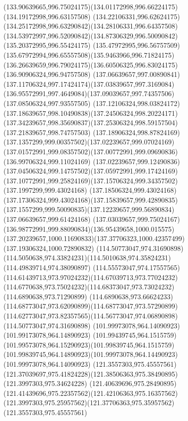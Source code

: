 {{		\curveto(133.90639665,996.75024175)(134.01172998,996.66224175)(134.19172998,996.63157508)
		\curveto(134.22106331,996.62624175)(134.25172998,996.63290842)(134.28106331,996.64357508)
		\curveto(134.53972997,996.52090842)(134.87306329,996.50090842)(135.20372995,996.55424175)
		\curveto(135.47972995,996.56757509)(135.67972994,996.65557508)(135.9463966,996.71824175)
		\curveto(136.26639659,996.79024175)(136.60506325,996.83024175)(136.90906324,996.94757508)
		\curveto(137.06639657,997.00890841)(137.11706324,997.17424174)(137.03839657,997.3169084)
		\curveto(136.95572991,997.4649084)(137.09039657,997.74357506)(137.08506324,997.93557505)
		\curveto(137.12106324,998.03824172)(137.18639657,998.10490838)(137.24506324,998.20224171)
		\curveto(137.34239657,998.35690837)(137.25306324,998.59157504)(137.21839657,998.74757503)
		\curveto(137.18906324,998.87824169)(137.1357299,999.00357502)(137.02239657,999.07024169)
		\curveto(137.01572991,999.08357502)(137.00772991,999.09690836)(136.99706324,999.11024169)
		\curveto(137.02239657,999.12490836)(137.04506324,999.14757502)(137.05972991,999.17424169)
		\curveto(137.10772991,999.25824169)(137.15706324,999.34357502)(137.1997299,999.43024168)
		\curveto(137.18506324,999.43024168)(137.17306324,999.43024168)(137.15839657,999.42890835)
		\curveto(137.1557299,999.50090835)(137.12239657,999.56890834)(137.06639657,999.61424168)
		\curveto(137.03039657,999.75024167)(136.98772991,999.88090834)(136.95439658,1000.015575)
		\curveto(137.20239657,1000.11690833)(137.37706323,1000.42357499)(137.19306324,1000.72890832)
		\moveto(114.50773047,974.31690898)
		\curveto(114.5050638,974.33824231)(114.5010638,974.35824231)(114.49839714,974.38090897)
		\curveto(114.55573047,974.17557565)(114.61439713,973.97024232)(114.67039713,973.77024232)
		\curveto(114.6770638,973.75024232)(114.68373047,973.73024232)(114.6890638,973.71290899)
		\curveto(114.6890638,973.66624233)(114.68773047,973.62090899)(114.68773047,973.57290899)
		\curveto(114.62773047,973.82357565)(114.56773047,974.06890898)(114.50773047,974.31690898)
		\moveto(101.99973078,964.14090923)
		\lineto(101.99173078,964.14890923)
		\curveto(101.99439745,964.1515759)(101.99573078,964.15290923)(101.99839745,964.1515759)
		\curveto(101.99839745,964.14890923)(101.99973078,964.14490923)(101.99973078,964.14090923)
		\moveto(121.3557303,975.45557561)
		\curveto(121.37039697,975.41824228)(121.38506363,975.38490895)(121.3997303,975.34624228)
		\curveto(121.40639696,975.28490895)(121.41439696,975.22357562)(121.42106363,975.16357562)
		\curveto(121.3997303,975.25957562)(121.37706363,975.35957562)(121.3557303,975.45557561)
}}

